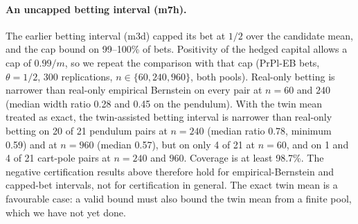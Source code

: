 \documentclass[11pt]{article}
\begin{document}
\paragraph{An uncapped betting interval (m7h).} The earlier betting interval (m3d) capped its bet at $1/2$ over the candidate mean, and the cap bound on 99--100\% of bets. Positivity of the hedged capital allows a cap of $0.99/m$, so we repeat the comparison with that cap (PrPl-EB bets, $\theta=1/2$, 300 replications, $n\in\{60,240,960\}$, both pools). Real-only betting is narrower than real-only empirical Bernstein on every pair at $n=60$ and $240$ (median width ratio 0.28 and 0.45 on the pendulum). With the twin mean treated as exact, the twin-assisted betting interval is narrower than real-only betting on 20 of 21 pendulum pairs at $n=240$ (median ratio 0.78, minimum 0.59) and at $n=960$ (median 0.57), but on only 4 of 21 at $n=60$, and on 1 and 4 of 21 cart-pole pairs at $n=240$ and $960$. Coverage is at least 98.7\%. The negative certification results above therefore hold for empirical-Bernstein and capped-bet intervals, not for certification in general. The exact twin mean is a favourable case: a valid bound must also bound the twin mean from a finite pool, which we have not yet done.
\end{document}
